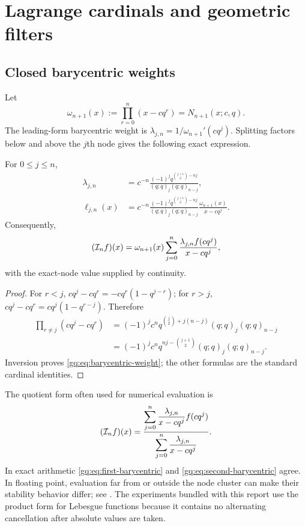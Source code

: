 \section{Lagrange cardinals and geometric filters}
\label{gq:chap:lagrange}

\subsection{Closed barycentric weights}

Let
\begin{equation}
 \omega_{n+1}(x):=\prod_{r=0}^n(x-cq^r)=N_{n+1}(x;c,q).
 \label{gq:eq:nodal-polynomial}
\end{equation}
The leading-form barycentric weight is
$\lambda_{j,n}=1/\omega_{n+1}'(cq^j)$.  Splitting factors below and above the
$j$th node gives the following exact expression.

\begin{theorem}
\label{gq:thm:geometric-barycentric}
For $0\le j\le n$,
\begin{align}
 \lambda_{j,n}
 &=c^{-n}\frac{(-1)^j
 q^{\binom{j+1}{2}-nj}}
 {(q;q)_j(q;q)_{n-j}},
 \label{gq:eq:barycentric-weight}\\
 \ell_{j,n}(x)
 &=c^{-n}\frac{(-1)^j
 q^{\binom{j+1}{2}-nj}}
 {(q;q)_j(q;q)_{n-j}}
 \frac{\omega_{n+1}(x)}{x-cq^j}.
 \label{gq:eq:lagrange-cardinal-explicit}
\end{align}
Consequently,
\begin{equation}
 (\mathcal I_nf)(x)
 =\omega_{n+1}(x)
  \sum_{j=0}^n\frac{\lambda_{j,n}f(cq^j)}{x-cq^j},
 \label{gq:eq:first-barycentric}
\end{equation}
with the exact-node value supplied by continuity.
\end{theorem}

\begin{proof}
For $r<j$,
$cq^j-cq^r=-cq^r(1-q^{j-r})$; for $r>j$,
$cq^j-cq^r=cq^j(1-q^{r-j})$.  Therefore
\begin{align*}
 \prod_{r\ne j}(cq^j-cq^r)
 &=(-1)^jc^n
 q^{\binom j2+j(n-j)}(q;q)_j(q;q)_{n-j}\\
 &=(-1)^jc^n
 q^{nj-\binom{j+1}{2}}(q;q)_j(q;q)_{n-j}.
\end{align*}
Inversion proves \eqref{gq:eq:barycentric-weight}; the other formulas are the
standard cardinal identities.
\end{proof}

The quotient form often used for numerical evaluation is
\begin{equation}
 (\mathcal I_nf)(x)=
 \frac{\displaystyle\sum_{j=0}^n
       \frac{\lambda_{j,n}}{x-cq^j}f(cq^j)}
      {\displaystyle\sum_{j=0}^n
       \frac{\lambda_{j,n}}{x-cq^j}}.
 \label{gq:eq:second-barycentric}
\end{equation}
In exact arithmetic \eqref{gq:eq:first-barycentric} and
\eqref{gq:eq:second-barycentric} agree.  In floating point, evaluation far from
or outside the node cluster can make their stability behavior differ; see
\cite{Higham2004,WebbTrefethenGonnet2012}.  The experiments bundled with this
report use the product form for Lebesgue functions because it contains no
alternating cancellation after absolute values are taken.

